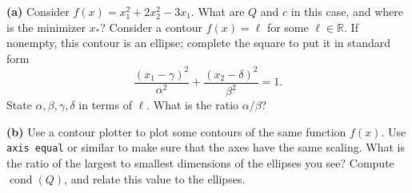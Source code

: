 \documentclass[12pt]{amsart}
\newcommand{\RR}{\mathbb{R}}
\newcommand{\epart}[1]{\medskip\noindent\textbf{(#1)}\quad }
\begin{document}
\epart{a} Consider $f(x) = x_1^2 + 2 x_2^2 - 3 x_1$.  What are $Q$ and $c$ in this case, and where is the minimizer $x_*$?  Consider a contour $f(x)=\ell$ for some $\ell\in\RR$.  If nonempty, this contour is an ellipse; complete the square to put it in standard form
	$$\frac{(x_1-\gamma)^2}{\alpha^2} + \frac{(x_2-\delta)^2}{\beta^2}=1.$$
State $\alpha,\beta,\gamma,\delta$ in terms of $\ell$.  What is the ratio $\alpha/\beta$?

\epart{b}  Use a contour plotter to plot some contours of the same function $f(x)$.  Use \texttt{axis equal} or similar to make sure that the axes have the same scaling.  What is the ratio of the largest to smallest dimensions of the ellipses you see?  Compute $\operatorname{cond}(Q)$, and relate this value to the ellipses.
\end{document}
